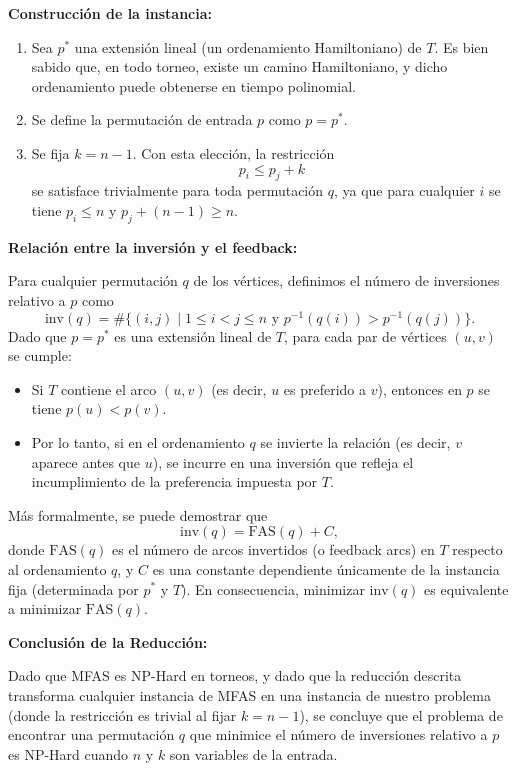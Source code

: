 ﻿\documentclass{article}
\theoremstyle{plain}
\theoremstyle{definition}
\begin{document}
\medskip

\textbf{Construcción de la instancia:}
\begin{enumerate}
    \item Sea $p^*$ una extensión lineal (un ordenamiento Hamiltoniano) de $T$. Es bien sabido que, en todo torneo, existe un camino Hamiltoniano, y dicho ordenamiento puede obtenerse en tiempo polinomial.
    \item Se define la permutación de entrada $p$ como $p=p^*$.
    \item Se fija $k=n-1$. Con esta elección, la restricción
    \[
    p_i \le p_j + k
    \]
    se satisface trivialmente para toda permutación $q$, ya que para cualquier $i$ se tiene $p_i \le n$ y $p_j + (n-1) \ge n$.
\end{enumerate}

\medskip

\textbf{Relación entre la inversión y el feedback:} 

Para cualquier permutación $q$ de los vértices, definimos el número de inversiones relativo a $p$ como
\[
\text{inv}(q) = \#\{(i,j) \mid 1\le i<j\le n \text{ y } p^{-1}(q(i)) > p^{-1}(q(j))\}.
\]
Dado que $p=p^*$ es una extensión lineal de $T$, para cada par de vértices $(u,v)$ se cumple:
\begin{itemize}
    \item Si $T$ contiene el arco $(u,v)$ (es decir, $u$ es preferido a $v$), entonces en $p$ se tiene $p(u) < p(v)$.
    \item Por lo tanto, si en el ordenamiento $q$ se invierte la relación (es decir, $v$ aparece antes que $u$), se incurre en una inversión que refleja el incumplimiento de la preferencia impuesta por $T$.
\end{itemize}
Más formalmente, se puede demostrar que
\[
\text{inv}(q) = \text{FAS}(q) + C,
\]
donde $\text{FAS}(q)$ es el número de arcos invertidos (o feedback arcs) en $T$ respecto al ordenamiento $q$, y $C$ es una constante dependiente únicamente de la instancia fija (determinada por $p^*$ y $T$). En consecuencia, minimizar $\text{inv}(q)$ es equivalente a minimizar $\text{FAS}(q)$.

\medskip

\textbf{Conclusión de la Reducción:}

Dado que MFAS es NP-Hard en torneos, y dado que la reducción descrita transforma cualquier instancia de MFAS en una instancia de nuestro problema (donde la restricción es trivial al fijar $k=n-1$), se concluye que el problema de encontrar una permutación $q$ que minimice el número de inversiones relativo a $p$ es NP-Hard cuando $n$ y $k$ son variables de la entrada.
\end{document}
